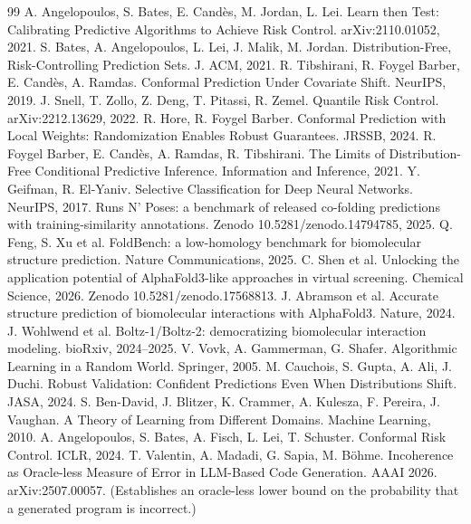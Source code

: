 \documentclass[10pt]{article}
\begin{document}
\small

\begin{thebibliography}{99}
 A. Angelopoulos, S. Bates, E. Cand\`es, M. Jordan, L. Lei.
Learn then Test: Calibrating Predictive Algorithms to Achieve Risk Control. arXiv:2110.01052, 2021.
 S. Bates, A. Angelopoulos, L. Lei, J. Malik, M. Jordan.
Distribution-Free, Risk-Controlling Prediction Sets. J. ACM, 2021.
 R. Tibshirani, R. Foygel Barber, E. Cand\`es, A. Ramdas.
Conformal Prediction Under Covariate Shift. NeurIPS, 2019.
 J. Snell, T. Zollo, Z. Deng, T. Pitassi, R. Zemel.
Quantile Risk Control. arXiv:2212.13629, 2022.
 R. Hore, R. Foygel Barber. Conformal Prediction with Local Weights:
Randomization Enables Robust Guarantees. JRSSB, 2024.
 R. Foygel Barber, E. Cand\`es, A. Ramdas, R. Tibshirani.
The Limits of Distribution-Free Conditional Predictive Inference. Information and Inference, 2021.
 Y. Geifman, R. El-Yaniv. Selective Classification for Deep Neural
Networks. NeurIPS, 2017.
 Runs N' Poses: a benchmark of released co-folding predictions with
training-similarity annotations. Zenodo 10.5281/zenodo.14794785, 2025.
 Q. Feng, S. Xu et al. FoldBench: a low-homology benchmark for
biomolecular structure prediction. Nature Communications, 2025.
 C. Shen et al. Unlocking the application potential of AlphaFold3-like
approaches in virtual screening. Chemical Science, 2026. Zenodo 10.5281/zenodo.17568813.
 J. Abramson et al. Accurate structure prediction of biomolecular interactions
with AlphaFold3. Nature, 2024.
 J. Wohlwend et al. Boltz-1/Boltz-2: democratizing biomolecular interaction
modeling. bioRxiv, 2024--2025.
 V. Vovk, A. Gammerman, G. Shafer. Algorithmic Learning in a Random World.
Springer, 2005.
 M. Cauchois, S. Gupta, A. Ali, J. Duchi. Robust Validation: Confident
Predictions Even When Distributions Shift. JASA, 2024.
 S. Ben-David, J. Blitzer, K. Crammer, A. Kulesza, F. Pereira, J. Vaughan.
A Theory of Learning from Different Domains. Machine Learning, 2010.
 A. Angelopoulos, S. Bates, A. Fisch, L. Lei, T. Schuster.
Conformal Risk Control. ICLR, 2024.
 T. Valentin, A. Madadi, G. Sapia, M. B\"ohme. Incoherence as Oracle-less
Measure of Error in LLM-Based Code Generation. AAAI 2026. arXiv:2507.00057. (Establishes an
oracle-less lower bound on the probability that a generated program is incorrect.)


\end{thebibliography}
\end{document}
